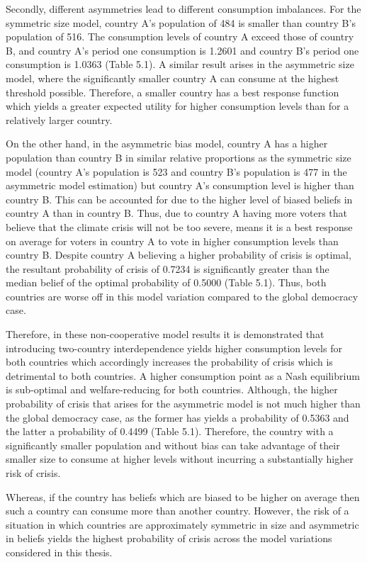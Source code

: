\documentclass[11pt,preprint, authoryear]{elsarticle}
\numberwithin{equation}{section}
\numberwithin{figure}{section}
\numberwithin{table}{section}
\begin{document}
Secondly, different asymmetries lead to different consumption
imbalances. For the symmetric size model, country A's population of 484
is smaller than country B's population of 516. The consumption levels of
country A exceed those of country B, and country A's period one
consumption is 1.2601 and country B's period one consumption is 1.0363
(Table 5.1). A similar result arises in the asymmetric size model, where
the significantly smaller country A can consume at the highest threshold
possible. Therefore, a smaller country has a best response function
which yields a greater expected utility for higher consumption levels
than for a relatively larger country.

On the other hand, in the asymmetric bias model, country A has a higher
population than country B in similar relative proportions as the
symmetric size model (country A's population is 523 and country B's
population is 477 in the asymmetric model estimation) but country A's
consumption level is higher than country B. This can be accounted for
due to the higher level of biased beliefs in country A than in country
B. Thus, due to country A having more voters that believe that the
climate crisis will not be too severe, means it is a best response on
average for voters in country A to vote in higher consumption levels
than country B. Despite country A believing a higher probability of
crisis is optimal, the resultant probability of crisis of 0.7234 is
significantly greater than the median belief of the optimal probability
of 0.5000 (Table 5.1). Thus, both countries are worse off in this model
variation compared to the global democracy case.

Therefore, in these non-cooperative model results it is demonstrated
that introducing two-country interdependence yields higher consumption
levels for both countries which accordingly increases the probability of
crisis which is detrimental to both countries. A higher consumption
point as a Nash equilibrium is sub-optimal and welfare-reducing for both
countries. Although, the higher probability of crisis that arises for
the asymmetric model is not much higher than the global democracy case,
as the former has yields a probability of 0.5363 and the latter a
probability of 0.4499 (Table 5.1). Therefore, the country with a
significantly smaller population and without bias can take advantage of
their smaller size to consume at higher levels without incurring a
substantially higher risk of crisis.

Whereas, if the country has beliefs which are biased to be higher on
average then such a country can consume more than another country.
However, the risk of a situation in which countries are approximately
symmetric in size and asymmetric in beliefs yields the highest
probability of crisis across the model variations considered in this
thesis.
\end{document}
